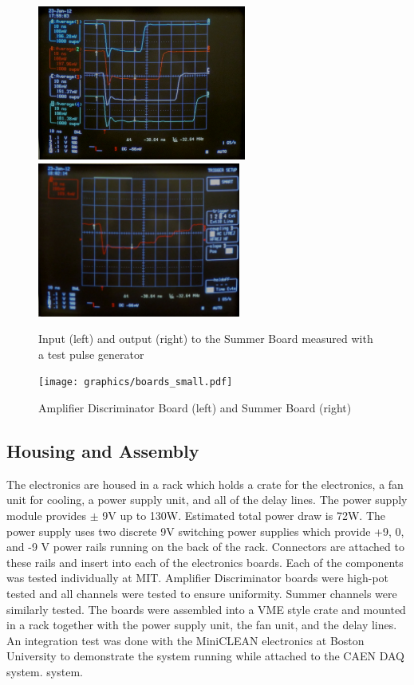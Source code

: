 \documentclass{JINST}
\begin{document}
\begin{figure}[ht]
	\begin{center}
		\includegraphics[height=2in, keepaspectratio=true]{graphics/sumpulseinput.jpg}
		\includegraphics[height=2in, keepaspectratio=true]{graphics/sumpulseoutput.jpg}
		\caption{Input (left) and output (right) to the Summer Board measured with a test pulse generator
		\label{fig:summerpulse}}
	\end{center}
\end{figure}

\begin{figure}[ht]
\begin{center}
\texttt{[image: graphics/boards\_small.pdf]}
\caption{Amplifier Discriminator Board (left) and Summer Board (right)
\label{fig:boards}}
\end{center}
\end{figure}

\subsection{Housing and Assembly}
\label{sec:Housing}
%
The electronics are housed in a rack which holds a crate for the
electronics, a fan unit for cooling, a power supply unit, and all of
the delay lines.  The power supply module provides $\pm$ 9V up to
130W.  Estimated total power draw is 72W.  The power supply uses two
discrete 9V switching power supplies which provide +9, 0, and -9 V
power rails running on the back of the rack.  Connectors are attached
to these rails and insert into each of the electronics boards.  Each
of the components was tested individually at MIT.  Amplifier
Discriminator boards were high-pot tested and all channels were tested
to ensure uniformity.  Summer channels were similarly tested.  The
boards were assembled into a VME style crate and mounted in a rack
together with the power supply unit, the fan unit, and the delay
lines.  An integration test was done with the MiniCLEAN electronics
at Boston University to
demonstrate the system running while attached to the CAEN DAQ system.
system.
\end{document}
